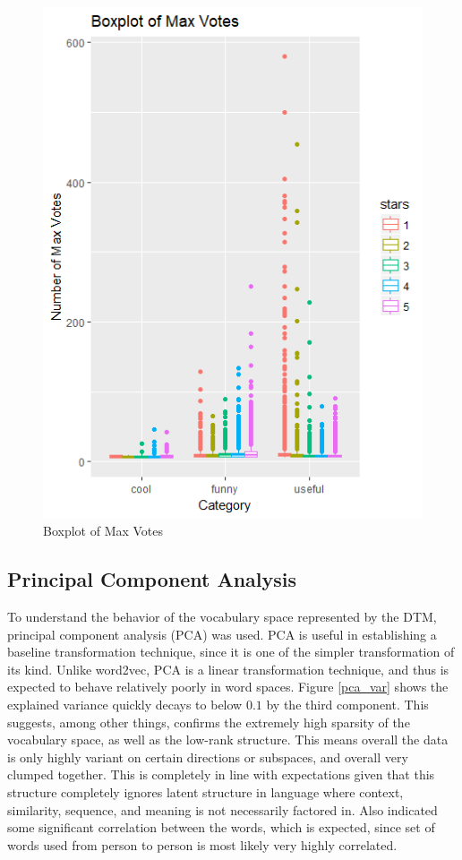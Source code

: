 \documentclass[letterpaper, 12 pt, conference]{ieeeconf}  %
\begin{document}
\begin{figure}[h]
	\centering
	\includegraphics[scale=0.50]{vote_category_boxplot.png}
	\caption{Boxplot of Max Votes}
    \label{vote_cate}
\end{figure}

\subsection{Principal Component Analysis}
To understand the behavior of the vocabulary space represented by the DTM, principal component analysis (PCA) was used. PCA is useful in establishing a baseline transformation technique, since it is one of the simpler transformation of its kind. Unlike word2vec, PCA is a linear transformation technique, and thus is expected to behave relatively poorly in word spaces. Figure \ref{pca_var} shows the explained variance quickly decays to below $0.1$ by the third component. This suggests, among other things, confirms the extremely high sparsity of the vocabulary space, as well as the low-rank structure. This means overall the data is only highly variant on certain directions or subspaces, and overall very clumped together. This is completely in line with expectations given that this structure completely ignores latent structure in language where context, similarity, sequence, and meaning is not necessarily factored in. Also indicated some significant correlation between the words, which is expected, since set of words used from person to person is most likely very highly correlated. 
\end{document}
